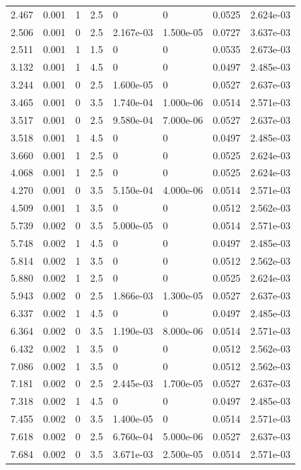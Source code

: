 \documentclass[preview]{standalone}
\begin{document}
{{\begin{tabular}{L{1.2cm}C{1.2cm} C{0.3cm}C{0.5cm} C{1.4cm}C{1.4cm} C{1.4cm}C{1.4cm}}
  2.467  &  0.001  & 1     & 2.5 &  0  & 0  & 0.0525 &  2.624e-03   \\ 
  2.506  &  0.001  & 0     & 2.5 &  2.167e-03  & 1.500e-05  & 0.0727 &  3.637e-03   \\ 
  2.511  &  0.001  & 1     & 1.5 &  0  & 0  & 0.0535 &  2.673e-03   \\ 
  3.132  &  0.001  & 1     & 4.5 &  0  & 0  & 0.0497 &  2.485e-03   \\ 
  3.244  &  0.001  & 0     & 2.5 &  1.600e-05  & 0  & 0.0527 &  2.637e-03   \\ 
  3.465  &  0.001  & 0     & 3.5 &  1.740e-04  & 1.000e-06  & 0.0514 &  2.571e-03   \\ 
  3.517  &  0.001  & 0     & 2.5 &  9.580e-04  & 7.000e-06  & 0.0527 &  2.637e-03   \\ 
  3.518  &  0.001  & 1     & 4.5 &  0  & 0  & 0.0497 &  2.485e-03   \\ 
  3.660  &  0.001  & 1     & 2.5 &  0  & 0  & 0.0525 &  2.624e-03   \\ 
  4.068  &  0.001  & 1     & 2.5 &  0  & 0  & 0.0525 &  2.624e-03   \\ 
  4.270  &  0.001  & 0     & 3.5 &  5.150e-04  & 4.000e-06  & 0.0514 &  2.571e-03   \\ 
  4.509  &  0.001  & 1     & 3.5 &  0  & 0  & 0.0512 &  2.562e-03   \\ 
  5.739  &  0.002  & 0     & 3.5 &  5.000e-05  & 0  & 0.0514 &  2.571e-03   \\ 
  5.748  &  0.002  & 1     & 4.5 &  0  & 0  & 0.0497 &  2.485e-03   \\ 
  5.814  &  0.002  & 1     & 3.5 &  0  & 0  & 0.0512 &  2.562e-03   \\ 
  5.880  &  0.002  & 1     & 2.5 &  0  & 0  & 0.0525 &  2.624e-03   \\ 
  5.943  &  0.002  & 0     & 2.5 &  1.866e-03  & 1.300e-05  & 0.0527 &  2.637e-03   \\ 
  6.337  &  0.002  & 1     & 4.5 &  0  & 0  & 0.0497 &  2.485e-03   \\ 
  6.364  &  0.002  & 0     & 3.5 &  1.190e-03  & 8.000e-06  & 0.0514 &  2.571e-03   \\ 
  6.432  &  0.002  & 1     & 3.5 &  0  & 0  & 0.0512 &  2.562e-03   \\ 
  7.086  &  0.002  & 1     & 3.5 &  0  & 0  & 0.0512 &  2.562e-03   \\ 
  7.181  &  0.002  & 0     & 2.5 &  2.445e-03  & 1.700e-05  & 0.0527 &  2.637e-03   \\ 
  7.318  &  0.002  & 1     & 4.5 &  0  & 0  & 0.0497 &  2.485e-03   \\ 
  7.455  &  0.002  & 0     & 3.5 &  1.400e-05  & 0  & 0.0514 &  2.571e-03   \\ 
  7.618  &  0.002  & 0     & 2.5 &  6.760e-04  & 5.000e-06  & 0.0527 &  2.637e-03   \\ 
  7.684  &  0.002  & 0     & 3.5 &  3.671e-03  & 2.500e-05  & 0.0514 &  2.571e-03   \\ 
\hline 
\end{tabular} 

}}
\end{document}
